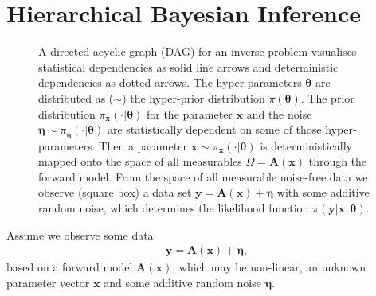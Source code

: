 \section{Hierarchical Bayesian Inference}
\label{sec:bayes}
\begin{figure}[ht!]
	\centering
	\caption[Hierarchical Bayesian Model]{A directed acyclic graph (DAG) for an inverse problem visualises statistical dependencies as solid line arrows and deterministic dependencies as dotted arrows.
		The hyper-parameters $\bm{\theta}$ are distributed as ($\sim$) the hyper-prior distribution $\pi(\bm{\theta})$.
		The prior distribution $ \pi_{\bm{x}}(\cdot|\bm{\theta})$ for the parameter $\bm{x}$ and the noise  $\bm{\eta} \sim \pi_{\bm{\eta}}(\cdot|\bm{\theta})$ are statistically dependent on some of those hyper-parameters.
		Then a parameter $\bm{x} \sim \pi_{\bm{x}}(\cdot|\bm{\theta})$ is deterministically mapped onto the space of all measurables $\Omega=\bm{A}(\bm{x})$ through the forward model.
		From the space of all measurable noise-free data we observe (square box) a data set $\bm{y} = \bm{A}(\bm{x}) + \bm{\eta}$ with some additive random noise, which determines the likelihood function $\pi(\bm{y}|\bm{x},\bm{\theta})$.}
	\label{fig:FirstDAG}
\end{figure}

Assume we observe some data
\begin{align}
	\bm{y} = \bm{A} (\bm{x}) + \bm{\eta},
	\label{eq:NonLinDat}
\end{align}
based on a forward model $\bm{A}(\bm{x})$, which may be non-linear, an unknown parameter vector $\bm{x}$ and some additive random noise $\bm{\eta}$.

